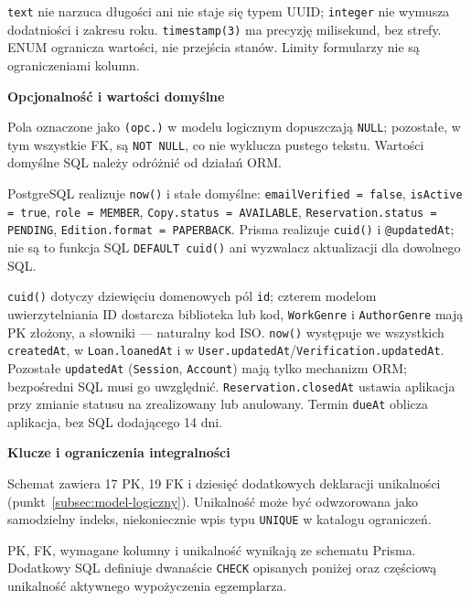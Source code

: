 \documentclass[11pt, a4paper]{article}
\begin{document}
\texttt{text} nie narzuca długości ani nie staje się typem UUID; \texttt{integer} nie wymusza dodatniości i zakresu roku. \texttt{timestamp(3)} ma precyzję milisekund, bez strefy. ENUM ogranicza wartości, nie przejścia stanów. Limity formularzy nie są ograniczeniami kolumn.

\noindent\textbf{Opcjonalność i wartości domyślne}

Pola oznaczone jako \texttt{(opc.)} w modelu logicznym dopuszczają \texttt{NULL}; pozostałe, w tym wszystkie FK, są \texttt{NOT NULL}, co nie wyklucza pustego tekstu. Wartości domyślne SQL należy odróżnić od działań ORM.~\cite{prisma-schema}


PostgreSQL realizuje \texttt{now()} i stałe domyślne: \texttt{emailVerified = false}, \texttt{isActive = true}, \texttt{role = MEMBER}, \texttt{Copy.status = AVAILABLE}, \texttt{Reservation.status = PENDING}, \texttt{Edition.format = PAPERBACK}. Prisma realizuje \texttt{cuid()} i \texttt{@updatedAt}; nie są to funkcja SQL \texttt{DEFAULT cuid()} ani wyzwalacz aktualizacji dla dowolnego SQL.

\texttt{cuid()} dotyczy dziewięciu domenowych pól \texttt{id}; czterem modelom uwierzytelniania ID dostarcza biblioteka lub kod, \texttt{WorkGenre} i \texttt{AuthorGenre} mają PK złożony, a słowniki --- naturalny kod ISO. \texttt{now()} występuje we wszystkich \texttt{createdAt}, w \texttt{Loan.loanedAt} i w \texttt{User.updatedAt}/\texttt{Verification.updatedAt}. Pozostałe \texttt{updatedAt} (\texttt{Session}, \texttt{Account}) mają tylko mechanizm ORM; bezpośredni SQL musi go uwzględnić. \texttt{Reservation.closedAt} ustawia aplikacja przy zmianie statusu na zrealizowany lub anulowany. Termin \texttt{dueAt} oblicza aplikacja, bez SQL dodającego 14 dni.

\noindent\textbf{Klucze i ograniczenia integralności}

Schemat zawiera 17 PK, 19 FK i dziesięć dodatkowych deklaracji unikalności (punkt~\ref{subsec:model-logiczny}). Unikalność może być odwzorowana jako samodzielny indeks, niekoniecznie wpis typu \texttt{UNIQUE} w katalogu ograniczeń.


PK, FK, wymagane kolumny i unikalność wynikają ze schematu Prisma. Dodatkowy SQL definiuje dwanaście \texttt{CHECK} opisanych poniżej oraz częściową unikalność aktywnego wypożyczenia egzemplarza.
\end{document}
